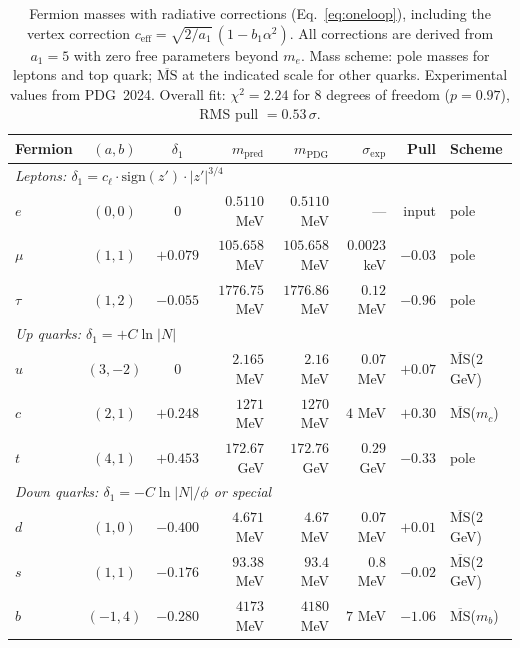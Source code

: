 \documentclass[12pt,a4paper]{article}
\theoremstyle{definition}
\begin{document}
\begin{table}[H]
\centering
\begin{tabular}{lccrrrrl}
\toprule
\textbf{Fermion} & $(a,b)$ & $\delta_1$ & $m_{\text{pred}}$ & $m_{\text{PDG}}$ & $\sigma_{\text{exp}}$ & \textbf{Pull} & \textbf{Scheme} \\
\midrule
\multicolumn{8}{l}{\textit{Leptons: $\delta_1 = c_\ell \cdot \mathrm{sign}(z') \cdot |z'|^{3/4}$}} \\
$e$   & $(0,0)$  & $0$      & $0.5110$ MeV  & $0.5110$ MeV  & ---          & input   & pole \\
$\mu$ & $(1,1)$  & $+0.079$ & $105.658$ MeV & $105.658$ MeV & $0.0023$ keV & $-0.03$ & pole \\
$\tau$& $(1,2)$  & $-0.055$ & $1776.75$ MeV & $1776.86$ MeV & $0.12$ MeV   & $-0.96$ & pole \\
\midrule
\multicolumn{8}{l}{\textit{Up quarks: $\delta_1 = +C\ln|N|$}} \\
$u$   & $(3,-2)$ & $0$      & $2.165$ MeV   & $2.16$ MeV    & $0.07$ MeV   & $+0.07$ & $\overline{\text{MS}}$(2\,GeV) \\
$c$   & $(2,1)$  & $+0.248$ & $1271$ MeV    & $1270$ MeV    & $4$ MeV      & $+0.30$ & $\overline{\text{MS}}$($m_c$) \\
$t$   & $(4,1)$  & $+0.453$ & $172.67$ GeV  & $172.76$ GeV  & $0.29$ GeV   & $-0.33$ & pole \\
\midrule
\multicolumn{8}{l}{\textit{Down quarks: $\delta_1 = -C\ln|N|/\phi$ or special}} \\
$d$   & $(1,0)$  & $-0.400$ & $4.671$ MeV   & $4.67$ MeV    & $0.07$ MeV   & $+0.01$ & $\overline{\text{MS}}$(2\,GeV) \\
$s$   & $(1,1)$  & $-0.176$ & $93.38$ MeV   & $93.4$ MeV    & $0.8$ MeV    & $-0.02$ & $\overline{\text{MS}}$(2\,GeV) \\
$b$   & $(-1,4)$ & $-0.280$ & $4173$ MeV    & $4180$ MeV    & $7$ MeV      & $-1.06$ & $\overline{\text{MS}}$($m_b$) \\
\bottomrule
\end{tabular}
\caption{Fermion masses with radiative corrections (Eq.~\eqref{eq:oneloop}), including the vertex correction $c_{\mathrm{eff}} = \sqrt{2/a_1}\,(1 - b_1\alpha^2)$.  All corrections are derived from $a_1 = 5$ with zero free parameters beyond $m_e$.  Mass scheme: pole masses for leptons and top quark; $\overline{\text{MS}}$ at the indicated scale for other quarks.  Experimental values from PDG~2024.  Overall fit: $\chi^2 = 2.24$ for 8 degrees of freedom ($p = 0.97$), RMS pull $= 0.53\,\sigma$.}
\label{tab:corrected_masses_normlog}
\end{table}
\end{document}
